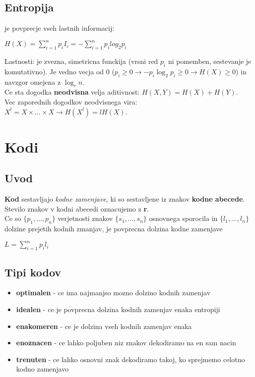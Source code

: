 \documentclass{article}
\begin{document}
\begin{multicols}{4}
\subsection{Entropija}
je povprecje vseh lastnih informacij:
\begin{center}
    \begin{math}
        H(X) = \sum_{i=1}^{n} p_i I_i = -\sum_{i=1}^{n} p_i log_2 p_i
    \end{math}
\end{center}
Lastnosti: je zvezna, simetricna funckija (vrsni red $p_i$ ni pomemben, sestevanje je komutativno). Je vedno vecja
od 0 ($p_i \geq 0 \rightarrow -p_i \log_2 p_i \geq 0 \rightarrow H(X) \geq 0$) in navzgor omejena z $\log_r n$.\\
Ce sta dogodka \textbf{neodvisna} velja aditivnost: $H(X, Y) = H(X) + H(Y)$.\\
Vec zaporednih dogodkov neodvisnega vira: $X^l = X \times \dots \times X \rightarrow H(X^l) = lH(X)$.

\section{Kodi}

\subsection{Uvod}
\textbf{Kod} sestavljajo \textit{kodne zamenjave}, ki so sestavljene iz znakov
\textbf{kodne abecede}. Stevilo znakov v kodni abecedi oznacujemo z \textbf{r}.\\
Ce so $\{p_1, \dots, p_n\}$ verjetnosti znakov $\{s_1, \dots, s_n\}$ osnovnega sporocila in $\{l_1, \dots, l_n\}$
dolzine prejetih kodnih zmanjav, je povprecna dolzina kodne zamenjave
\begin{center}
    \begin{math}
        L = \sum_{i=1}^n p_i l_i
    \end{math}
\end{center}

\subsection{Tipi kodov}
\begin{itemize}
    \item \textbf{optimalen} - ce ima najmanjso mozno dolzino kodnih zamenjav
    \item \textbf{idealen} - ce je povprecna dolzina kodnih zamenjav enaka entropiji
    \item \textbf{enakomeren} - ce je dolzina vseh kodnih zamenjav enaka
    \item \textbf{enoznacen} - ce lahko poljuben niz znakov dekodiramo na en sam nacin
    \item \textbf{trenuten} - ce lahko osnovni znak dekodiramo takoj, ko sprejmemo celotno kodno zamenjavo
\end{itemize}


\end{multicols}
\end{document}
